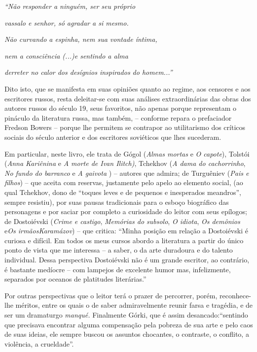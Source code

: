 \emph{``Não responder a ninguém, ser seu próprio}

\emph{vassalo e senhor, só agradar a si mesmo.}

\emph{Não curvando a espinha, nem sua vontade íntima,}

\emph{nem a consciência (...)e sentindo a alma}

\emph{derreter no calor dos desígnios inspirados do homem...''}

Dito isto, que se manifesta em suas opiniões quanto ao regime, aos
censores e aos escritores russos, resta deleitar-se com suas análises
extraordinárias das obras dos autores russos do século 19, seus
favoritos, não apenas porque representam o pináculo da literatura russa,
mas também, -- conforme repara o prefaciador Fredson Bowers -- porque
lhe permitem se contrapor ao utilitarismo dos críticos sociais do século
anterior e dos escritores soviéticos que lhes sucederam.

Em particular, neste livro, ele trata de Gógol (\emph{Almas mortas} e
\emph{O capote}), Tolstói (\emph{Anna Kariênina} e \emph{A morte de Ivan
Ilitch)}, Tchekhov (\emph{A dama do cachorrinho}, \emph{No fundo do
barranco} e \emph{A gaivota} ) -- autores que admira; de Turguêniev
(\emph{Pais e filhos}) -- que aceita com reservas, justamente pelo apelo
ao elemento social, (ao qual Tchekhov, dono de ``toques leves e de
pequenos e inesperados meandros'', sempre resistiu), por suas pausas
tradicionais para o esboço biográfico das personagens e por saciar por
completo a curiosidade do leitor com seus epílogos; de Dostoiévski
(\emph{Crime e castigo}, \emph{Memórias do subsolo}, \emph{O idiota},
\emph{Os demônios} e\emph{Os irmãosKaramázov}) -- que critica: ``Minha
posição em relação a Dostoiévski é curiosa e difícil. Em todos os meus
cursos abordo a literatura a partir do único ponto de vista que me
interessa -- a saber, o da arte duradoura e do talento individual. Dessa
perspectiva Dostoiévski não é um grande escritor, ao contrário, é
bastante medíocre -- com lampejos de excelente humor mas, infelizmente,
separados por oceanos de platitudes literárias.''

Por outras perspectivas que o leitor terá o prazer de percorrer, porém,
reconhece-lhe méritos, entre os quais o de saber admiravelmente reunir
farsa e tragédia, e de ser um dramaturgo \emph{manqué.} Finalmente
Górki, que é assim desancado:``sentindo que precisava encontrar alguma
compensação pela pobreza de sua arte e pelo caos de suas ideias, ele
sempre buscou os assuntos chocantes, o contraste, o conflito, a
violência, a crueldade''.

